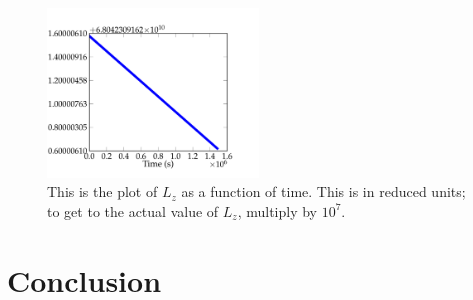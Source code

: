 \documentclass[11pt,letterpaper]{article}
\begin{document}
\begin{figure}[bth]
\centering
\includegraphics[width=0.5\textwidth]{output4_figs/angular_momentum.pdf}
\caption{This is the plot of $L_z$ as a function of time. This is in reduced units; to get to the actual value of $L_z$, multiply by $10^7$.}
\label{fig:simpleplot2}
\end{figure}

\section{Conclusion}
\end{document}
